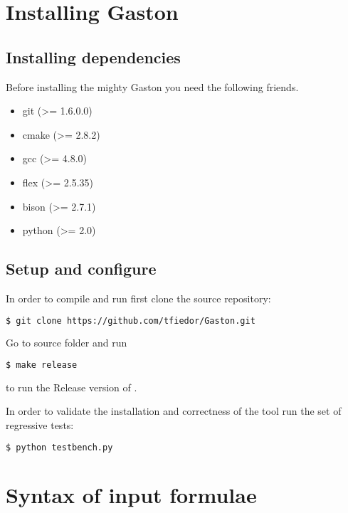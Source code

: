 \appendix
\chapter{Installing Gaston}
\begin{intro}

\end{intro}

\section{Installing dependencies}

Before installing the mighty Gaston you need the following friends.

\begin{itemize}
	\item[] git (>= 1.6.0.0)
	\item[] cmake (>= 2.8.2)
	\item[] gcc (>= 4.8.0)
	\item[] flex (>= 2.5.35)
	\item[] bison (>= 2.7.1)
	\item[] python (>= 2.0)
\end{itemize}

\section{Setup and configure}

In order to compile and run \gaston first clone the source repository:

\begin{lstlisting}[language=bash]
 $ git clone https://github.com/tfiedor/Gaston.git
\end{lstlisting}

Go to source folder and run
\begin{lstlisting}[language=bash]
 $ make release
\end{lstlisting}
to run the Release version of \gaston.

In order to validate the installation and correctness of the tool
run the set of regressive tests:

\begin{lstlisting}[language=bash]
 $ python testbench.py
\end{lstlisting}

\chapter{Syntax of input formulae}

